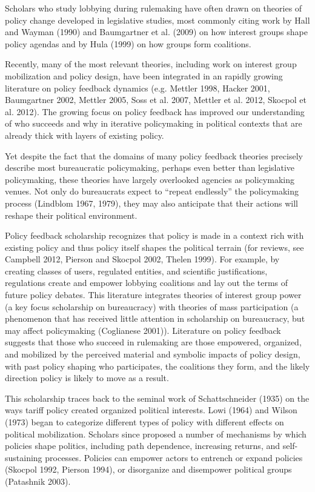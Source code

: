 Scholars who study lobbying during rulemaking have often drawn on theories of policy change developed in legislative studies, most commonly citing work by Hall and Wayman (1990) and Baumgartner et al. (2009) on how interest groups shape policy agendas and by Hula (1999) on how groups form coalitions. 

Recently, many of the most relevant theories, including work on interest group mobilization and policy design, have been integrated in an rapidly growing literature on policy feedback dynamics (e.g. Mettler 1998, Hacker 2001, Baumgartner 2002, Mettler 2005, Soss et al. 2007, Mettler et al. 2012, Skocpol et al. 2012). The growing focus on policy feedback has improved our understanding of who succeeds and why in iterative policymaking in political contexts that are already thick with layers of existing policy. 

Yet despite the fact that the domains of many policy feedback theories precisely describe most bureaucratic policymaking, perhaps even better than legislative policymaking, these theories have largely overlooked agencies as policymaking venues. Not only do bureaucrats expect to ``repeat endlessly'' the policymaking process (Lindblom 1967, 1979), they may also anticipate that their actions will reshape their political environment. 


Policy feedback scholarship recognizes that policy is made in a context rich with existing policy and thus policy itself shapes the political terrain (for reviews, see Campbell 2012, Pierson and Skocpol 2002, Thelen 1999). For example, by creating classes of users, regulated entities, and scientific justifications, regulations create and empower lobbying coalitions and lay out the terms of future policy debates. This literature integrates theories of interest group power (a key focus scholarship on bureaucracy) with theories of mass participation (a phenomenon that has received little attention in scholarship on bureaucracy, but may affect policymaking (Coglianese 2001)). Literature on policy feedback suggests that those who succeed in rulemaking are those empowered, organized, and mobilized by the perceived material and symbolic impacts of policy design, with past policy shaping who participates, the coalitions they form, and the likely direction policy is likely to move as a result. 

This scholarship traces back to the seminal work of Schattschneider (1935) on the ways tariff policy created organized political interests. Lowi (1964) and Wilson (1973) began to categorize different types of policy with different effects on political mobilization. Scholars since proposed a number of mechanisms by which policies shape politics, including path dependence, increasing returns, and self-sustaining processes. Policies can empower actors to entrench or expand policies (Skocpol 1992, Pierson 1994), or disorganize and disempower political groups (Patashnik 2003). 

